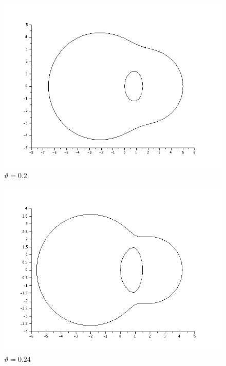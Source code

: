 \documentclass{article}
\begin{document}
\begin{itemize}
\begin{figure}[H]
\includegraphics[width=\textwidth]{img/ej6-3.png}
\caption{$\vartheta = 0.2$ }
\end{figure}

\begin{figure}[H]
\includegraphics[width=\textwidth]{img/ej6-4.png}
\caption{$\vartheta = 0.24$ }
\end{figure}


\end{itemize}
\end{document}
